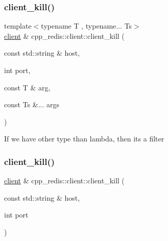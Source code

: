 \subsubsection{\texorpdfstring{client\+\_\+kill()}{client\_kill()}\hspace{0.1cm}{\footnotesize\ttfamily [2/5]}}
{\footnotesize\ttfamily template$<$typename T , typename... Ts$>$ \\
\hyperlink{classcpp__redis_1_1client}{client} \& cpp\+\_\+redis\+::client\+::client\+\_\+kill (\begin{DoxyParamCaption}\item[{const std\+::string \&}]{host,  }\item[{int}]{port,  }\item[{const T \&}]{arg,  }\item[{const Ts \&...}]{args }\end{DoxyParamCaption})\hspace{0.3cm}{\ttfamily [inline]}}

If we have other type than lambda, then it\textquotesingle{}s a filter \mbox{\label{classcpp__redis_1_1client_a3163e1f29d65a5e7b0d4165be154fb96}} 
\subsubsection{\texorpdfstring{client\+\_\+kill()}{client\_kill()}\hspace{0.1cm}{\footnotesize\ttfamily [3/5]}}
{\footnotesize\ttfamily \hyperlink{classcpp__redis_1_1client}{client} \& cpp\+\_\+redis\+::client\+::client\+\_\+kill (\begin{DoxyParamCaption}\item[{const std\+::string \&}]{host,  }\item[{int}]{port }\end{DoxyParamCaption})\hspace{0.3cm}{\ttfamily [inline]}}

\mbox{\label{classcpp__redis_1_1client_a38df8e614a5ac9533a1993b7dec7be6b}} 
